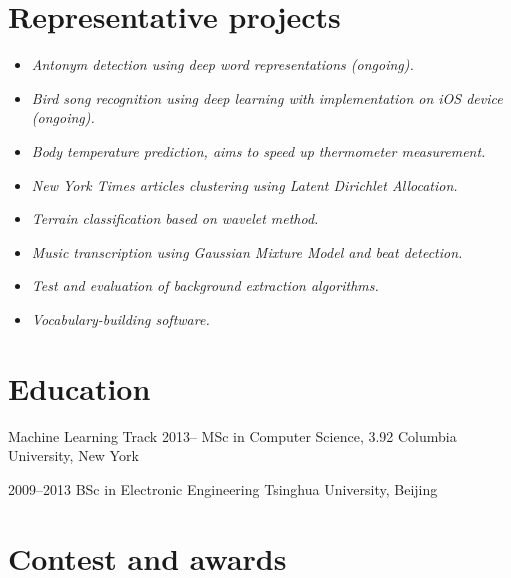 \documentclass{tccv}
\begin{document}
\vspace{-10pt}

\section{Representative projects}

\begin{itemize}
\itemsep0em
\item {\it
Antonym detection using deep word representations (ongoing).}
\item {\it
Bird song recognition using deep learning with implementation on iOS device (ongoing).}
\item {\it
Body temperature prediction, aims to speed up thermometer measurement.}
\item {\it
New York Times articles clustering using Latent Dirichlet Allocation.}
\item {\it
Terrain classification based on wavelet method.}
\item {\it
Music transcription using Gaussian Mixture Model and beat detection.}
\item {\it
Test and evaluation of background extraction algorithms.}
\item {\it
Vocabulary-building software.}
\end{itemize}

\vfill

\section{Education}

\begin{yearlist}
\item[Machine Learning Track]{2013--}
     {MSc in Computer Science, 3.92}
     {Columbia University, New York}{}{}

\item[]{2009--2013}
     {BSc in Electronic Engineering}
     {Tsinghua University, Beijing}{}{}


\end{yearlist}

\section{Contest and awards}
\end{document}
